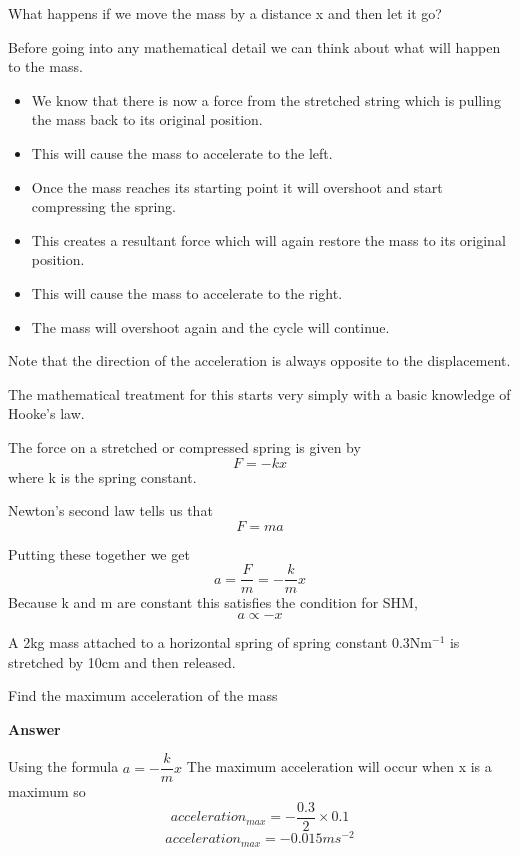 \documentclass[revision-guide.tex]{subfiles}
\begin{document}
What happens if we move the mass by a distance x and then let it go?



Before going into any mathematical detail we can think about what will happen to the mass.
\begin{itemize}
\item We know that there is now a force from the stretched string which is pulling the mass back to its original position. 
\item This will cause the mass to accelerate to the left. 
\item Once the mass reaches its starting point it will overshoot and start compressing the spring.
\item This creates a resultant force which will again restore the mass to its original position.
\item This will cause the mass to accelerate to the right.
\item The mass will overshoot again and the cycle will continue.
\end{itemize}
Note that the direction of the acceleration is always opposite to the displacement.

The mathematical treatment for this starts very simply with a basic knowledge of Hooke's law.

The force on a stretched or compressed spring is given by 
\[
F=-kx
\]
where k is the spring constant.

Newton's second law tells us that 
\[
F=ma
\]

Putting these together we get
\[
a = \dfrac{F}{m}=-\dfrac{k}{m}x
\]
Because k and m are constant this satisfies the condition for SHM,
\[
a \propto -x
\]

\begin{example}
A  2kg mass attached to a horizontal spring of spring constant 0.3Nm$^{-1}$ is stretched by 10cm and then released.

Find the maximum acceleration of the mass


	\vspace{1cm}

		

		\textbf{Answer}

Using the formula $a = -\dfrac{k}{m}x$
The maximum acceleration will occur when x is a maximum so 
\[
acceleration_{max} = - \dfrac{0.3}{2} \times 0.1
\]
\[
acceleration_{max} = -0.015 ms^{-2}
\]

\end{example}
\end{document}
